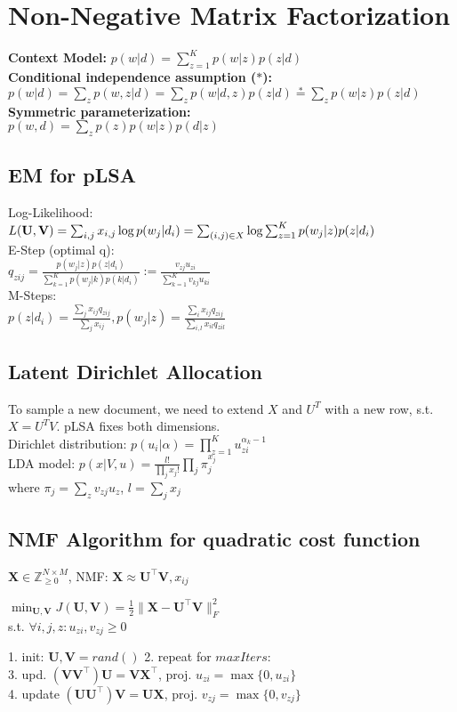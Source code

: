 \section{Non-Negative Matrix Factorization}
\textbf{Context Model:} $p(w | d) = \sum_{z=1}^K p(w | z) p(z | d)$\\
\textbf{Conditional independence assumption ($*$):}\\
$p(w|d) = \sum_z p(w,z|d) = \sum_z p(w|d,z)p(z|d) \stackrel{*}{=} \sum_z p(w|z)p(z|d)$\\
\textbf{Symmetric parameterization:}\\
$p(w, d) = \sum_z p(z)p(w | z) p(d | z)$

\subsection*{EM for pLSA}
Log-Likelihood: $L(\mathbf{U}, \mathbf{V}) = \sum_{i,j} x_{i,j}\log p(w_j|d_i) \\
= \sum_{(i,j) \in X} \log \sum_{z=1}^K p(w_j|z)p(z|d_i)$\\
E-Step (optimal q):\\
$q_{zij} = \frac{p(w_j|z)p(z|d_i)}{\sum_{k=1}^K p(w_j|k)p(k|d_i)} := \frac{v_{zj}u_{zi}}{\sum_{k=1}^K v_{kj}u_{ki}}$\\
M-Steps:\\
$p(z|d_i) = \frac{\sum_j x_{ij}q_{zij}}{\sum_j x_{ij}}, p(w_j|z) = \frac{\sum_i x_{ij}q_{zij}}{\sum_{i,l}x_{il}q_{zil}}$\\

\subsection*{Latent Dirichlet Allocation}
To sample a new document, we need to extend $X$ and $U^T$ with a new row, s.t. $X=U^T V$. pLSA fixes both dimensions.\\
Dirichlet distribution: $p(u_i|\alpha) = \prod_{z=1}^K u_{zi}^{\alpha_k-1}$\\
LDA model: $p(x|V,u) = \frac{l!}{\prod_j x_j!}\prod_j \pi_j^{x_j}$\\
where $\pi_j=\sum_z v_{zj} u_z$, $l=\sum_j x_j$

\subsection*{NMF Algorithm for quadratic cost function}
$\mathbf{X} \in \mathbb{Z}^{N \times M}_{\geq 0}$, NMF: $\mathbf{X} \approx \mathbf{U^\top V}, x_{ij}$

$\min_{\mathbf{U}, \mathbf{V}} J(\mathbf{U}, \mathbf{V}) = \frac{1}{2} \|\mathbf{X} - \mathbf{U}^\top\mathbf{V}\|_F^2$\\
s.t. $\forall i,j,z:u_{zi},v_{zj} \geq 0 $


1. init: $\mathbf{U}, \mathbf{V} = rand()$ 2. repeat for $\mathit{maxIters}$:\\
3. upd. $(\mathbf{VV}^\top)\mathbf{U} = \mathbf{VX}^\top$, proj. $u_{zi} = \max \{ 0, u_{zi} \}$\\
4. update $(\mathbf{UU}^\top)\mathbf{V} = \mathbf{UX}$, proj. $v_{zj} = \max \{ 0, v_{zj} \}$
